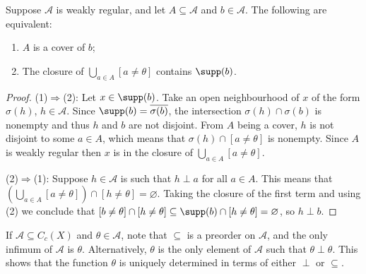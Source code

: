 \begin{lemma}\label{lemmacovers}
Suppose $\mathcal{A}$ is weakly regular, and let $A\subseteq\mathcal{A}$ and $b\in\mathcal{A}$. The following are equivalent:
\begin{enumerate}
\item[(1)] $A$ is a cover of $b$;
\item[(2)] The closure of $\bigcup_{a\in A}[a\neq\theta]$ contains $\supp(b)$.
\end{enumerate}
\end{lemma}
\begin{proof}
(1)$\Rightarrow$(2): Let $x\in\supp(b)$. Take an open neighbourhood of $x$ of the form $\sigma(h)$, $h\in\mathcal{A}$. Since $\supp(b)=\overline{\sigma(b)}$, the intersection $\sigma(h)\cap\sigma(b)$ is nonempty and thus $h$ and $b$ are not disjoint. From $A$ being a cover, $h$ is not disjoint to some $a\in A$, which means that $\sigma(h)\cap[a\neq\theta]$ is nonempty. Since $A$ is weakly regular then $x$ is in the closure of $\bigcup_{a\in A}[a\neq\theta]$.

(2)$\Rightarrow$(1): Suppose $h\in\mathcal{A}$ is such that $h\perp a$ for all $a\in A$. This means that $(\bigcup_{a\in A}[a\neq\theta])\cap[h\neq\theta]=\varnothing$. Taking the closure of the first term and using (2) we conclude that $[b\neq\theta]\cap[h\neq\theta]\subseteq\supp(b)\cap[h\neq\theta]=\varnothing$, so $h\perp b$.\qedhere
\end{proof}


If $\mathcal{A}\subseteq C_c(X)$ and $\theta\in\mathcal{A}$, note that $\subseteq$ is a preorder on $\mathcal{A}$, and the only infimum of $\mathcal{A}$ is $\theta$. Alternatively, $\theta$ is the only element of $\mathcal{A}$ such that $\theta\perp\theta$. This shows that the function $\theta$ is uniquely determined in terms of either $\perp$ or $\subseteq$. 

